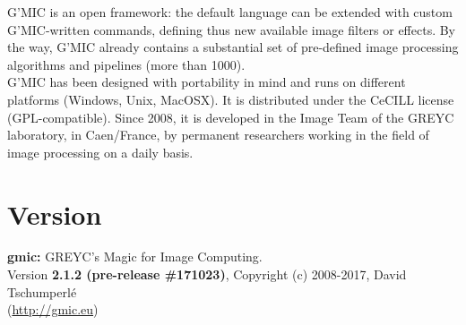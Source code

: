 \documentclass[a4paper,10.5pt,twoside]{book}
\newcommand{\Ca}[1]{\textcolor{ca}{#1}}
\newcommand{\Cb}[1]{\textcolor{cb}{#1}}
\newcommand{\Cc}[1]{\textcolor{cc}{#1}}
\begin{document}
\Cc{G'MIC} is an open framework: the default language can be extended with custom \Cc{G'MIC}-written commands, defining thus new available image filters or effects. By the way, \Cc{G'MIC} already contains a substantial set of pre-defined image processing algorithms and pipelines (more than 1000).\\ 
 
\Cc{G'MIC} has been designed with portability in mind and runs on different platforms (Windows, Unix, MacOSX). It is distributed under the CeCILL license (GPL-compatible). Since 2008, it is developed in the Image Team of the GREYC laboratory, in Caen/France, by permanent researchers working in the field of image processing on a daily basis. 
\section*{Version} 
 
 \Ca{\textbf{gmic:} GREYC's Magic for Image Computing.}\\ 
 
        \Cb{Version \textbf{2.1.2 (pre-release \#171023)}, Copyright (c) 2008-2017, David Tschumperl\'e}\\ 
        \Cb{(\url{http://gmic.eu})} 
\end{document}
